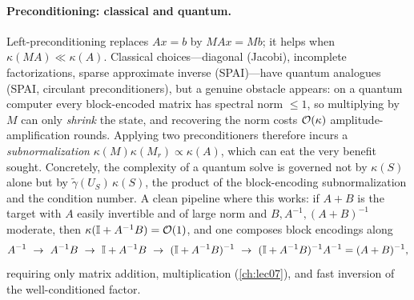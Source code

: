 \paragraph{Preconditioning: classical and quantum.}
Left-preconditioning replaces $Ax=b$ by $MAx=Mb$; it helps when $\kappa(MA)\ll\kappa(A)$.
Classical choices---diagonal (Jacobi), incomplete factorizations, sparse approximate
inverse (SPAI)---have quantum analogues (SPAI, circulant preconditioners), but a genuine
obstacle appears: on a quantum computer every block-encoded matrix has spectral norm
$\le1$, so multiplying by $M$ can only \emph{shrink} the state, and recovering the norm
costs $\mathcal{O}(\kappa)$ amplitude-amplification rounds. Applying two preconditioners
therefore incurs a \emph{subnormalization} $\kappa(M)\kappa(M_r)\propto\kappa(A)$, which
can eat the very benefit sought. Concretely, the complexity of a quantum solve is
governed not by $\kappa(S)$ alone but by $\tilde\gamma(U_S)\,\kappa(S)$, the product of
the block-encoding subnormalization and the condition number. A clean pipeline where
this works: if $A+B$ is the target with $A$ easily invertible and of large norm and
$B,A^{-1},(A+B)^{-1}$ moderate, then $\kappa(\mathbb{I}+A^{-1}B)=\mathcal{O}(1)$, and one composes
block encodings along
\begin{equation}
  A^{-1}\ \to\ A^{-1}B\ \to\ \id+A^{-1}B\ \to\ (\id+A^{-1}B)^{-1}
  \ \to\ (\id+A^{-1}B)^{-1}A^{-1}=(A+B)^{-1},
  \label{eq:lec10-precond-pipeline}
\end{equation}
requiring only matrix addition, multiplication (\cref{ch:lec07}), and fast inversion of
the well-conditioned factor.

